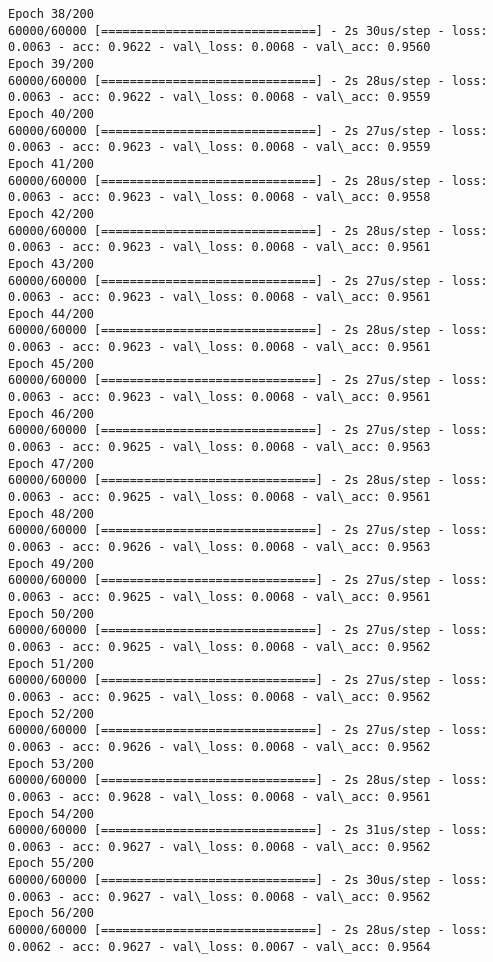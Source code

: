 \documentclass[11pt]{article}
\begin{document}
\begin{Verbatim}[commandchars=\\\{\}]
Epoch 38/200
60000/60000 [==============================] - 2s 30us/step - loss: 0.0063 - acc: 0.9622 - val\_loss: 0.0068 - val\_acc: 0.9560
Epoch 39/200
60000/60000 [==============================] - 2s 28us/step - loss: 0.0063 - acc: 0.9622 - val\_loss: 0.0068 - val\_acc: 0.9559
Epoch 40/200
60000/60000 [==============================] - 2s 27us/step - loss: 0.0063 - acc: 0.9623 - val\_loss: 0.0068 - val\_acc: 0.9559
Epoch 41/200
60000/60000 [==============================] - 2s 28us/step - loss: 0.0063 - acc: 0.9623 - val\_loss: 0.0068 - val\_acc: 0.9558
Epoch 42/200
60000/60000 [==============================] - 2s 28us/step - loss: 0.0063 - acc: 0.9623 - val\_loss: 0.0068 - val\_acc: 0.9561
Epoch 43/200
60000/60000 [==============================] - 2s 27us/step - loss: 0.0063 - acc: 0.9623 - val\_loss: 0.0068 - val\_acc: 0.9561
Epoch 44/200
60000/60000 [==============================] - 2s 28us/step - loss: 0.0063 - acc: 0.9623 - val\_loss: 0.0068 - val\_acc: 0.9561
Epoch 45/200
60000/60000 [==============================] - 2s 27us/step - loss: 0.0063 - acc: 0.9623 - val\_loss: 0.0068 - val\_acc: 0.9561
Epoch 46/200
60000/60000 [==============================] - 2s 27us/step - loss: 0.0063 - acc: 0.9625 - val\_loss: 0.0068 - val\_acc: 0.9563
Epoch 47/200
60000/60000 [==============================] - 2s 28us/step - loss: 0.0063 - acc: 0.9625 - val\_loss: 0.0068 - val\_acc: 0.9561
Epoch 48/200
60000/60000 [==============================] - 2s 27us/step - loss: 0.0063 - acc: 0.9626 - val\_loss: 0.0068 - val\_acc: 0.9563
Epoch 49/200
60000/60000 [==============================] - 2s 27us/step - loss: 0.0063 - acc: 0.9625 - val\_loss: 0.0068 - val\_acc: 0.9561
Epoch 50/200
60000/60000 [==============================] - 2s 27us/step - loss: 0.0063 - acc: 0.9625 - val\_loss: 0.0068 - val\_acc: 0.9562
Epoch 51/200
60000/60000 [==============================] - 2s 27us/step - loss: 0.0063 - acc: 0.9625 - val\_loss: 0.0068 - val\_acc: 0.9562
Epoch 52/200
60000/60000 [==============================] - 2s 27us/step - loss: 0.0063 - acc: 0.9626 - val\_loss: 0.0068 - val\_acc: 0.9562
Epoch 53/200
60000/60000 [==============================] - 2s 28us/step - loss: 0.0063 - acc: 0.9628 - val\_loss: 0.0068 - val\_acc: 0.9561
Epoch 54/200
60000/60000 [==============================] - 2s 31us/step - loss: 0.0063 - acc: 0.9627 - val\_loss: 0.0068 - val\_acc: 0.9562
Epoch 55/200
60000/60000 [==============================] - 2s 30us/step - loss: 0.0063 - acc: 0.9627 - val\_loss: 0.0068 - val\_acc: 0.9562
Epoch 56/200
60000/60000 [==============================] - 2s 28us/step - loss: 0.0062 - acc: 0.9627 - val\_loss: 0.0067 - val\_acc: 0.9564

\end{Verbatim}
\end{document}
